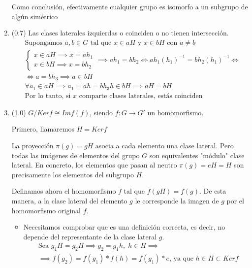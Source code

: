 \documentclass[a4paper,12pt]{article}
\begin{document}
\begin{enumerate}
        Como conclusión, efectivamente cualquier grupo es isomorfo a un subgrupo de algún simétrico


    \item (0.7) Las clases laterales izquierdas o coinciden o no tienen intersección.
        \begin{equation*}
            \begin{split}
                & \text{Supongamos } a,b \in G \text{ tal que } x \in aH \text{ y } x \in bH \text{ con } a\neq b\\
                & \begin{cases}
                    x \in aH \implies x = ah_{1}\\
                    x \in bH \implies x = bh_{2}
                \end{cases} \implies ah_{1} = bh_{2} \iff ah_{1}(h_{1})^{-1} = bh_{2}(h_{1})^{-1} \iff\\
            & \iff a = bh_{3} \implies a \in bH\\
            & \forall a_1 \in aH \implies a_{1} = ah = bh_{3}h \in bH \implies aH = bH\\
            & \text{Por lo tanto, si $x$ comparte clases laterales, estás coinciden}
            \end{split} 
        \end{equation*}

        \pagebreak
    
    \item (1.0) $G / Kerf \cong Imf(f)$, siendo $f:G\to G'$ un homomorfismo.

    Primero, llamaremos $H = Kerf$

    La proyección $\pi(g)= gH$ asocia a cada elemento una clase lateral. Pero todas las imágenes de elementos del grupo $G$ son equivalentes "módulo" clase lateral. En concreto, los elementos que pasan al neutro $\pi (g) = eH = H$ son precisamente los elementos del subgrupo $H$.

    Definamos ahora el homomorfismo $\bar{f}$ tal que $\bar{f}(gH)=f(g)$. De esta manera, a la clase lateral del elemento $g$ le corresponde la imagen de $g$ por el homomorfismo original $f$.

    \begin{itemize}
        \item Necesitamos comprobar que es una definición correcta, es decir, no depende del representante de la clase lateral $g$.
        \begin{equation*}
            \begin{split} 
                & \text{Sea } g_{1}H = g_{2}H \implies g_2 = g_{1}h, \; h \in H \implies\\
                & \implies f(g_{2})=f(g_{1})*f(h)=f(g_{1})*e \text{, ya que } h \in H \subset Kerf
            \end{split}
        \end{equation*}


\end{itemize}
\end{enumerate}
\end{document}
